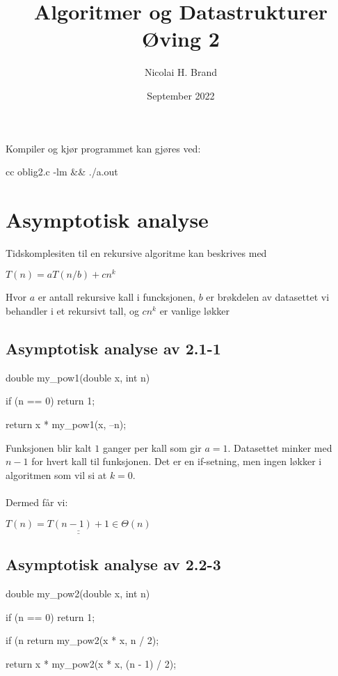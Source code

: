 \documentclass{article}
\title{Algoritmer og Datastrukturer Øving 2}
\author{Nicolai H. Brand}
\date{September 2022}
\def\dunderline#1{\underline{\underline{#1}}}
\begin{document}
\maketitle

Kompiler og kjør programmet kan gjøres ved:
\begin{ffcode}
cc oblig2.c -lm && ./a.out
\end{ffcode}

\section{Asymptotisk analyse}

Tidskomplesiten til en rekursive algoritme kan beskrives med

$ T(n) = aT(n/b) + cn^k $

Hvor \(a\) er antall rekursive kall i funcksjonen, \(b\) er brøkdelen av datasettet vi behandler i et rekursivt tall, og \(cn^k\) er vanlige løkker

\subsection{Asymptotisk analyse av 2.1-1}
\begin{ffcode}
double my_pow1(double x, int n)
{
    if (n == 0)
        return 1;
        
    return x * my_pow1(x, --n);
}
\end{ffcode}

Funksjonen blir kalt \(1\) ganger per kall som gir \(a = 1\). Datasettet minker med \(n - 1\) for hvert kall til funksjonen. Det er en if-setning, men ingen løkker i algoritmen som vil si at \(k = 0\).\\\\
Dermed får vi:

$ \dunderline{T(n) = T(n - 1) + 1 \in \Theta(n)} $\\

\subsection{Asymptotisk analyse av 2.2-3}
\begin{ffcode}
double my_pow2(double x, int n)
{
    if (n == 0)
        return 1;
    
    if (n %
        return my_pow2(x * x, n / 2);
        
    return x * my_pow2(x * x, (n - 1) / 2);
}
\end{ffcode}
\end{document}
